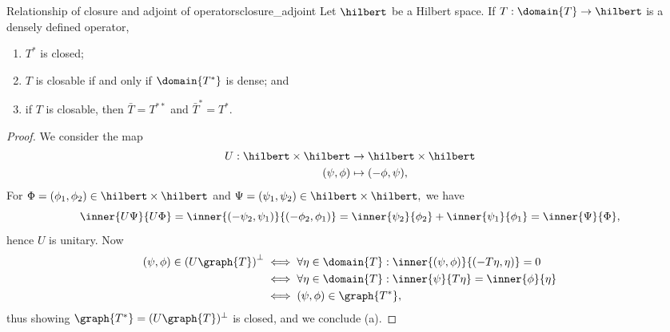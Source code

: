 \begin{proposition}{Relationship of closure and adjoint of operators}{closure_adjoint}
    Let \(\hilbert\) be a Hilbert space. If \(T : \domain{T} \to \hilbert\) is a densely defined operator,
    \begin{enumerate}[label=(\alph*)]
        \item \(T^*\) is closed;
        \item \(T\) is closable if and only if \(\domain{T^*}\) is dense; and
        \item if \(T\) is closable, then \(\bar{T} = T^{**}\) and \(\bar{T}^* = T^*.\)
    \end{enumerate}
\end{proposition}
\begin{proof}
    We consider the map
    \begin{align*}
        U : \hilbert \times \hilbert &\to \hilbert \times \hilbert\\
                         (\psi,\phi) &\mapsto (-\phi, \psi),
    \end{align*}
    For \(\Phi = (\phi_1, \phi_2) \in \hilbert \times \hilbert\) and \(\Psi = (\psi_1, \psi_2) \in \hilbert \times \hilbert,\) we have
    \begin{equation*}
        \inner{U\Psi}{U\Phi} = \inner{(-\psi_2, \psi_1)}{(-\phi_2, \phi_1)} = \inner{\psi_2}{\phi_2} + \inner{\psi_1}{\phi_1} = \inner{\Psi}{\Phi},
    \end{equation*}
    hence \(U\) is unitary. Now
    \begin{align*}
        (\psi,\phi) \in \left(U \graph{T}\right)^\perp &\iff \forall \eta \in \domain{T} : \inner{(\psi,\phi)}{(- T\eta,\eta)} = 0\\
                                                       &\iff \forall \eta \in \domain{T} : \inner{\psi}{T \eta} = \inner{\phi}{\eta}\\
                                                       &\iff (\psi, \phi) \in \graph{T^*},
    \end{align*}
    thus showing \(\graph{T^*} = (U \graph{T})^\perp\) is closed, and we conclude (a). 


\end{proof}
